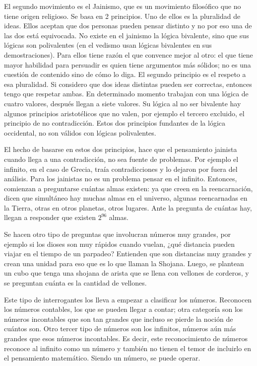 El segundo movimiento es el Jainismo, que es un movimiento filosófico que no tiene origen religioso. Se basa en 2 principios. Uno de ellos es la pluralidad de ideas. Ellos aceptan que dos personas pueden pensar distinto y no por eso una de las dos está equivocada. No existe en el jainismo la lógica bivalente, sino que sus lógicas son polivalentes (en el vedismo usan lógicas bivalentes en sus demostraciones). Para ellos tiene razón el que convence mejor al otro: el que tiene mayor habilidad para persuadir es quien tiene argumentos más sólidos; no es una cuestión de contenido sino de cómo lo diga. El segundo principio es el respeto a esa pluralidad. Si considero que dos ideas distintas pueden ser correctas, entonces tengo que respetar ambas. En determinado momento trabajan con una lógica de cuatro valores, después llegan a siete valores. Su lógica al no ser bivalente hay algunos principios aristotélicos que no valen, por ejemplo el tercero excluido, el principio de no contradicción. Estos dos principios fundantes de la lógica occidental, no son válidos con lógicas polivalentes. 

El hecho de basarse en estos dos principios, hace que el pensamiento jainista cuando llega a una contradicción, no sea fuente de problemas. Por ejemplo el infinito, en el caso de Grecia, traía contradicciones y lo dejaron por fuera del análisis. Para los jainistas no es un problema pensar en el infinito. Entonces, comienzan a preguntarse cuántas almas existen: ya que creen en la reencarnación, dicen que simultáneo hay muchas almas en el universo, algunas reencarnadas en la Tierra, otras en otros planetas, otros lugares. Ante la pregunta de cuántas hay, llegan a responder que existen $2^{96}$ almas. 

Se hacen otro tipo de preguntas que involucran números muy grandes, por ejemplo si los dioses son muy rápidos cuando vuelan, ¿qué distancia pueden viajar en el tiempo de un parpadeo? Entienden que son distancias muy grandes y crean una unidad para eso que es lo que llaman la Shojana. Luego, se plantean un cubo que tenga una shojana de arista que se llena con vellones de corderos, y se preguntan cuánta es la cantidad de vellones. 

Este tipo de interrogantes los lleva a empezar a clasificar los números. Reconocen los números contables, los que se pueden llegar a contar; otra categoría son los números incontables que son tan grandes que incluso se pierde la noción de cuántos son. Otro tercer tipo de números son los infinitos, números aún más grandes que esos números incontables. Es decir, este reconocimiento de números reconoce al infinito como un número y también no tienen el temor de incluirlo en el pensamiento matemático. Siendo un número, se puede operar. 

